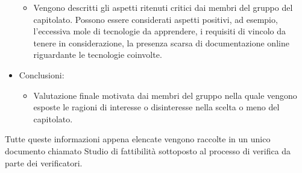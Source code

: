 \begin{itemize}
	\begin{itemize}
	\item Vengono descritti gli aspetti ritenuti critici dai membri del gruppo \Gruppo del capitolato.
	Possono essere considerati aspetti positivi, ad esempio, l'eccessiva mole di tecnologie da apprendere, i requisiti di vincolo da tenere in considerazione, la presenza scarsa di documentazione online riguardante le tecnologie coinvolte.
	\end{itemize}
\item Conclusioni:
	\begin{itemize}
	\item Valutazione finale motivata dai membri del gruppo \Gruppo nella quale vengono esposte le ragioni di interesse o disinteresse nella scelta o meno del capitolato.
	\end{itemize}
\end{itemize}
Tutte queste informazioni appena elencate vengono raccolte in un unico documento chiamato Studio di fattibilità sottoposto al processo di verifica da parte dei verificatori.

